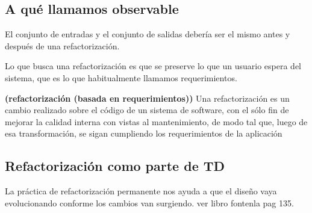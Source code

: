 \documentclass[../main.tex]{subfiles}
\begin{document}
    \subsection{A qué llamamos observable}
        El conjunto de entradas y el conjunto de salidas debería ser el mismo antes y después de una refactorización.

        Lo que busca una refactorización es que se preserve lo que un usuario espera del sistema, que es lo que habitualmente llamamos requerimientos.

        \begin{definition} \textbf{(refactorización (basada en requerimientos))}
            Una refactorización es un cambio realizado sobre el código de un sistema de software, con el sólo fin de mejorar la calidad interna con vistas al mantenimiento, de modo tal que, luego de esa transformación, se sigan cumpliendo los requerimientos de la aplicación
        \end{definition}


    \subsection{Refactorización como parte de TD}
        La práctica de refactorización permanente nos ayuda a que el
        diseño vaya evolucionando conforme los cambios van surgiendo. ver libro fontenla pag 135.
\end{document}
